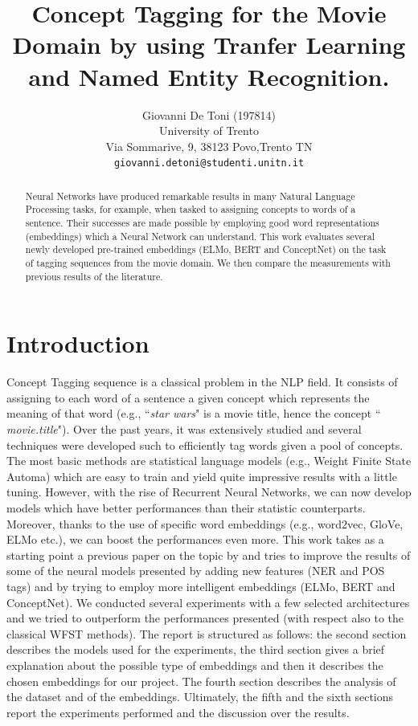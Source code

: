 \documentclass[11pt,a4paper]{article}
\title{Concept Tagging for the Movie Domain by using Tranfer Learning and Named Entity Recognition.}
\author{Giovanni De Toni (197814) \\
  University of Trento \\ Via Sommarive, 9, 38123 Povo,Trento TN\\
  \texttt{giovanni.detoni@studenti.unitn.it}}
\date{}
\begin{document}
\maketitle

\begin{abstract}
Neural Networks have produced remarkable results in many Natural Language Processing tasks, for example, when tasked to assigning concepts to words of a sentence. Their successes are made possible by employing good word representations (embeddings) which a Neural Network can understand. This work evaluates several newly developed pre-trained embeddings (ELMo, BERT and ConceptNet) on the task of tagging sequences from the movie domain. We then compare the measurements with previous results of the literature.
\end{abstract}

\section{Introduction}
Concept Tagging sequence is a classical problem in 
the NLP field. It consists of assigning to each word 
of a sentence a given concept which represents the 
meaning of that word (e.g., ``\textit{star wars}" is 
a movie title, hence the concept ``
\textit{movie.title}"). Over the past years, it was 
extensively studied and several techniques were 
developed such to efficiently tag words given a pool 
of concepts. The most basic methods are statistical 
language models (e.g., Weight Finite State Automa) 
which are easy to train and yield quite impressive 
results with a little tuning. However, with the rise 
of Recurrent Neural Networks, we can now develop 
models which have better performances than their 
statistic counterparts. Moreover, thanks to the use 
of specific word embeddings (e.g., word2vec, GloVe, 
ELMo etc.), we can boost the performances even more.
This work takes as a starting point a previous paper 
on the topic by \citet{gobbi} and tries to improve 
the results of some of the neural models presented 
by adding new features (NER and POS tags) and 
by trying to employ more intelligent embeddings 
(ELMo, BERT and ConceptNet). We conducted several experiments with a few selected architectures and we tried to outperform the performances presented (with respect also to the classical WFST methods).  The report is 
structured as follows: the second section describes 
the models used for the experiments, the third section gives a brief explanation about the possible type of embeddings and then it describes the chosen embeddings for our project.  The fourth section describes the analysis of the 
dataset and of the embeddings. Ultimately, the fifth
and the sixth sections report the experiments 
performed and the discussion over the results.
 	
\end{document}
